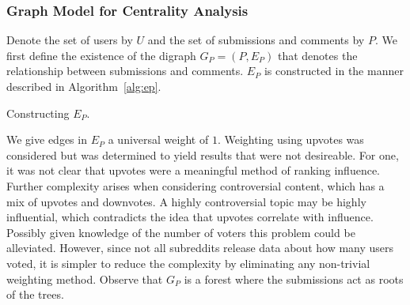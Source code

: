 \documentclass[letterpaper, 10 pt, conference]{ieeeconf}
\theoremstyle{definition}
\begin{document}
\subsubsection{Graph Model for Centrality Analysis}
Denote the set of users by \(U\) and the set of submissions and comments by \(P.\) We first define the existence of the digraph \(G_P=(P,E_P)\) that denotes the relationship between submissions and comments. \(E_P\) is constructed in the manner described in Algorithm~\ref{alg:ep}.
\begin{algorithm}
  \caption{Constructing \(E_P.\)}
  \label{alg:ep}
\end{algorithm}
We give edges in \(E_P\) a universal weight of \(1.\) Weighting using upvotes was considered but was determined to yield results that were not desireable. For one, it was not clear that upvotes were a meaningful method of ranking influence. Further complexity arises when considering controversial content, which has a mix of upvotes and downvotes. A highly controversial topic may be highly influential, which contradicts the idea that upvotes correlate with influence. Possibly given knowledge of the number of voters this problem could be alleviated. However, since not all subreddits release data about how many users voted, it is simpler to reduce the complexity by eliminating any non-trivial weighting method. Observe that \(G_P\) is a forest where the submissions act as roots of the trees.
\end{document}
